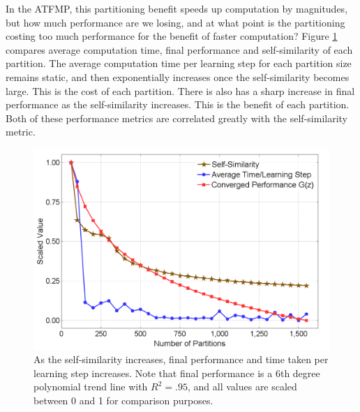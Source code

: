 \documentclass{aamas2014}
\begin{document}
In the ATFMP, this partitioning benefit speeds up computation by magnitudes, but how much performance are we losing, and at what point is the partitioning costing too much performance for the benefit of faster computation? Figure \ref{NewPartitionComparisons} compares average computation time, final performance and self-similarity of each partition. The average computation time per learning step for each partition size remains static, and then exponentially increases once the self-similarity becomes large. This is the cost of each partition. There is also has a sharp increase in final performance as the self-similarity increases. This is the benefit of each partition. Both of these performance metrics are correlated greatly with the self-similarity metric.


\begin{figure}
\centering
\includegraphics[width=1.0\columnwidth]{NewPartitionComparisons}
\caption{As the self-similarity increases, final performance and time taken per learning step increases. Note that final performance is a 6th degree polynomial trend line with $R^2 = .95$, and all values are scaled between 0 and 1 for comparison purposes.}
\label{NewPartitionComparisons}
\end{figure}

\end{document}
